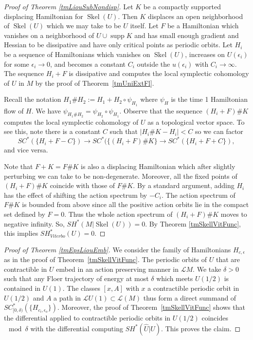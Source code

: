 \documentclass[11pt]{amsart}
\DeclareMathOperator{\Skel}{Skel}
\DeclareMathOperator{\supp}{supp}
\theoremstyle{definition}
\theoremstyle{remark}
\begin{document}
\begin{proof}[Proof of Theorem \ref{tmLiouSubNondisp}]
Let $K$ be a compactly supported displacing Hamiltonian for $\Skel(U)$. Then $K$ displaces an open neighborhood of $\Skel(U)$ which we may take to be $U$ itself. Let $F$ be a Hamiltonian which vanishes on a neighborhood of $U\cup \supp K$ and has small enough gradient and Hessian to be dissipative and have only critical points as periodic orbits.  Let  $H_i$ be a sequence of Hamiltonians which vanishes on $\Skel(U)$, increases on $U(\epsilon_i)$ for some $\epsilon_i\to 0$, and becomes a constant $C_i$ outside the $u(\epsilon_i)$ with $C_i\to\infty$. The sequence $H_i+F$ is dissipative and computes the local symplectic cohomology of $U$ in $M$ by the proof of Theorem~\ref{tmUniExtFl}.

Recall the notation $H_1\#H_2:=H_1+H_2\circ\psi_{H_1}$ where $\psi_{H}$ is the time 1 Hamiltonian flow of $H$. We have $\psi_{H_1\#H_2}=\psi_{H_2}\circ\psi_{H_1}$. Observe that the sequence $(H_i+F)\# K$ computes the local symplectic cohomology of $U$ as a topological vector space. To see this, note there is a constant $C$ such that $|H_i\# K-H_i|<C$ so we can factor
\[
SC^*(\{H_i+F-C\})\to SC^*(\{(H_i+F)\# K\}\to SC^*(\{H_i+F+C\}),
\]
and vice versa.

Note that $F+K=F\#K$ is also a displacing Hamiltonian which after slightly perturbing we can take to be non-degenerate. Moreover, all the fixed points of $(H_i+F)\# K$ coincide with those of $F\#K$. By a standard argument\cite{Usher2010}, adding $H_i$ has the effect of shifting the action spectrum by $-C_i$. The action spectrum of $F\#K$ is bounded from above since all the positive action orbits lie in the compact set defined by $F=0$. Thus the whole action spectrum of $(H_i+F)\# K$ moves to negative infinity. So, $SH^*(M|\Skel(U))=0$. By Theorem \ref{tmSkellVitFunc}, this implies $SH^*_{Viterbo}(U)=0$.
\end{proof}

\begin{proof}[Proof of Theorem \ref{tmEpsLiouEmb}]
We consider the family of Hamiltonians $H_{c,\epsilon}$ as in the proof of Theorem~\ref{tmSkellVitFunc}. The periodic orbits of $U$ that are contractible in $U$ embed in an action preserving manner in $\mathcal{L}M$. We take $\delta>0$ such that any Floer trajectory of energy at most $\delta$ which meets $U(1/2)$ is contained in $U(1)$. The classes $[x,A]$ with $x$ a contractible periodic orbit in $U(1/2)$ and $A$ a path in $\mathcal{L}U(1)\subset\mathcal{L}(M)$ thus form a direct summand of $SC_{[0,\delta)}^*(\{H_{c_i,\epsilon_o}\})$. Moreover, the proof of Theorem~\ref{tmSkellVitFunc} shows that the differential applied to contractible periodic orbits in $U(1/2)$ coincides $\mod\delta$ with the differential computing $SH^*(\hat{U}|U)$. This proves the claim.
\end{proof}
\end{document}
